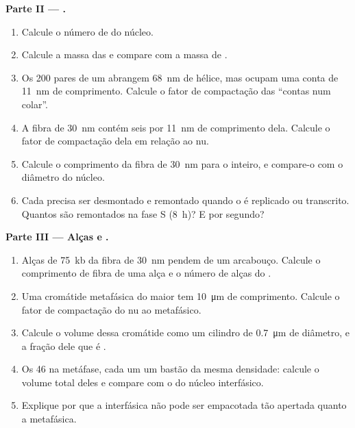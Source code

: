 \begin{problem}
\medskip
\noindent\textbf{Parte II --- .}
\begin{enumerate}[resume]
  \item Calcule o número de  do núcleo.
  \item Calcule a massa das  e compare com a massa de .
  \item Os \qty{200}{} pares de um  abrangem \qty{68}{nm} de
        hélice, mas ocupam uma conta de \qty{11}{nm} de comprimento.
        Calcule o fator de compactação das ``contas num colar''.
  \item A fibra de \qty{30}{nm} contém seis  por
        \qty{11}{nm} de comprimento dela. Calcule o fator de compactação
        dela em relação ao  nu.
  \item Calcule o comprimento da fibra de \qty{30}{nm} para o 
        inteiro, e compare-o com o diâmetro do núcleo.
  \item Cada  precisa ser desmontado e remontado quando o 
        é replicado ou transcrito. Quantos  são remontados
        na fase S (\qty{8}{h})? E por segundo?
\end{enumerate}

\medskip
\noindent\textbf{Parte III --- Alças e .}
\begin{enumerate}[resume]
  \item Alças de \qty{75}{kb} da fibra de \qty{30}{nm} pendem de um
        arcabouço. Calcule o comprimento de fibra de uma alça e o número
        de alças do .
  \item Uma cromátide metafásica do maior  tem
        \qty{10}{\micro m} de comprimento. Calcule o fator de
        compactação do  nu ao  metafásico.
  \item Calcule o volume dessa cromátide como um cilindro de
        \qty{0.7}{\micro m} de diâmetro, e a fração dele que é .
  \item Os 46  na metáfase, cada um um bastão da mesma
        densidade: calcule o volume total deles e compare com o do
        núcleo interfásico.
  \item Explique por que a  interfásica não pode ser empacotada
        tão apertada quanto a metafásica.
\end{enumerate}


\end{problem}
